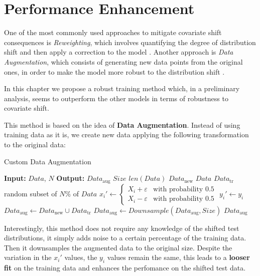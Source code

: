 \chapter{Performance Enhancement}

One of the most commonly used approaches to mitigate covariate shift consequences is \textit{Reweighting}, which involves quantifying the degree of distribution shift and then apply a correction to the model \cite{zhang}. Another approach is \textit{Data Augmentation}, which consists of generating new data points from the original ones, in order to make the model more robust to the distribution shift \cite{zhao}. 

In this chapter we propose a robust training method which, in a preliminary analysis, seems to outperform the other models in terms of robustness to covariate shift.

This method is based on the idea of \textbf{Data Augmentation}. Instead of using training data as it is, we create new data applying the following transformation to the original data:

\begin{algorithm}[H]
    \caption{Custom Data Augmentation}
    \begin{algorithmic}[1]
        \Statex \textbf{Input:} $Data$, $N$
        \Statex \textbf{Output:} $Data_\text{aug}$
        \Statex
        \State $Size$ \leftarrow $len(Data)$ 
        \State $Data_\text{new}$ \leftarrow $Data$
        \State $Data_\text{tr}$ \leftarrow random subset of $N\%$ of $Data$
            \State $x_i' \leftarrow 
            \begin{cases}
                X_i + \varepsilon & \text{with probability } 0.5 \\
                X_i - \varepsilon & \text{with probability } 0.5
            \end{cases}$
            \State $y_i' \leftarrow y_i$
        \EndFor
        \State $Data_\text{aug} \leftarrow Data_\text{new} \cup Data_\text{tr}$
        \State $Data_\text{aug} \leftarrow Downsample(Data_\text{aug}, Size)$
        \State\Return $Data_\text{aug}$
    \end{algorithmic}
\end{algorithm}

Interestingly, this method does not require any knowledge of the shifted test distributions, it simply adds noise to a certain percentage of the training data. Then it downsamples the augmented data to the original size.
Despite the variation in the $x_i'$ values, the $y_i$ values remain the same, this leads to a \textbf{looser fit} on the training data and enhances the perfomance on the shifted test data.

